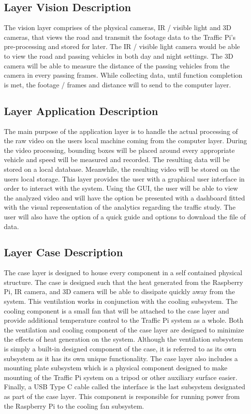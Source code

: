 \subsection{Layer Vision Description}
The vision layer comprises of the physical cameras, IR / visible light and 3D cameras, that views the road and transmit the footage data to the Traffic Pi's pre-processing and stored for later. The IR / visible light camera would be able to view the road and passing vehicles in both day and night settings. The 3D camera will be able to measure the distance of the passing vehicles from the camera in every passing frames. While collecting data, until function completion is met, the footage / frames and distance will to send to the computer layer.

\subsection{Layer Application Description}
The main purpose of the application layer is to handle the actual processing of the raw video on the users local machine coming from the computer layer. During the video processing, bounding boxes will be placed around every appropriate vehicle and speed will be measured and recorded. The resulting data will be stored on a local database. Meanwhile, the resulting video will be stored on the users local storage. This layer provides the user with a graphical user interface in order to interact with the system. Using the GUI, the user will be able to view the analyzed video and will have the option be presented with a dashboard fitted with the visual representation of the analytics regarding the traffic study. The user will also have the option of a quick guide and options to download the file of data.

\subsection{Layer Case Description}
The case layer is designed to house every component in a self contained physical structure. The case is designed such that the heat generated from the Raspberry Pi, IR camera, and 3D camera will be able to dissipate quickly away from the system. This ventilation works in conjunction with the cooling subsystem. The cooling component is a small fan that will be attached to the case layer and provide additional temperature control to the Traffic Pi system as a whole. Both the ventilation and cooling component of the case layer are designed to minimize the effects of heat generation on the system. Although the ventilation subsystem is simply a built-in designed component of the case, it is referred to as its own subsystem as it has its own unique functionality. The case layer also includes a mounting plate subsystem which is a physical component designed to make mounting of the Traffic Pi system on a tripod or other auxiliary surface easier. Finally, a USB Type C cable called the interface is the last subsystem designated as part of the case layer. This component is responsible for running power from the Raspberry Pi to the cooling fan subsystem.

